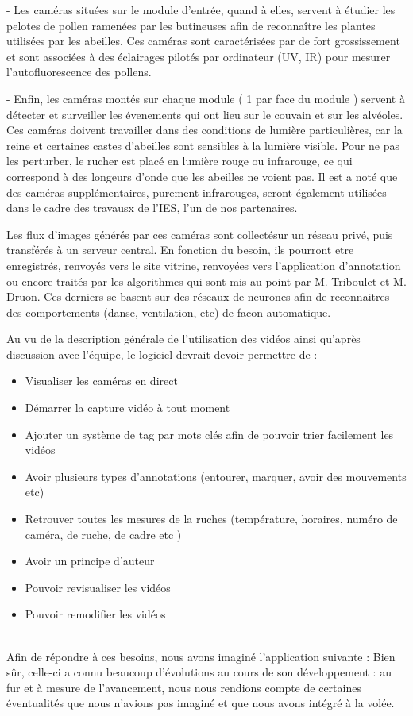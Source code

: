 \documentclass[11pt,french,a4paper]{report}
\begin{document}
- Les caméras situées sur le module d'entrée, quand à elles, servent à étudier
  les pelotes de pollen ramenées par les butineuses afin de reconnaître les
  plantes utilisées par les abeilles. Ces caméras sont caractérisées par de
  fort grossissement et sont associées à des éclairages pilotés par ordinateur
  (UV, IR) pour mesurer l'autofluorescence des pollens.

- Enfin, les caméras montés sur chaque module ( 1 par face du module ) servent
  à détecter et surveiller les évenements qui ont lieu sur le couvain et sur
  les alvéoles. Ces caméras doivent travailler dans des conditions de lumière
  particulières, car la reine et certaines castes d'abeilles sont sensibles à
  la lumière visible. Pour ne pas les perturber, le rucher est placé en
  lumière rouge ou infrarouge, ce qui correspond à des longeurs d'onde que les
  abeilles ne voient pas. Il est a noté que des caméras supplémentaires,
  purement infrarouges, seront également utilisées dans le cadre des travausx de
  l'IES, l'un de nos partenaires.


  Les flux d'images générés par ces caméras sont collectésur un réseau privé,
  puis transférés à un serveur central. En fonction du besoin, ils pourront
  etre enregistrés, renvoyés vers le site vitrine, renvoyées vers l'application d'annotation
  ou encore traités par les algorithmes qui sont mis au point par M. Triboulet et M. Druon. 
  Ces derniers se basent sur des réseaux de neurones afin de reconnaitres des comportements
  (danse, ventilation, etc) de facon automatique.


Au vu de la description générale de l'utilisation des vidéos ainsi qu'après discussion avec l'équipe, le logiciel devrait devoir permettre de : \\
\begin{itemize}
    \item Visualiser les caméras en direct
    \item Démarrer la capture vidéo à tout moment 
    \item Ajouter un système de tag par mots clés afin de pouvoir trier facilement les vidéos 
    \item Avoir plusieurs types d'annotations (entourer, marquer, avoir des mouvements etc) 
    \item Retrouver toutes les mesures de la ruches (température, horaires, numéro de caméra, de ruche, de cadre etc )  
    \item Avoir un principe d'auteur 
    \item Pouvoir revisualiser les vidéos 
    \item Pouvoir remodifier les vidéos 
\end{itemize} \\
Afin de répondre à ces besoins, nous avons imaginé l'application suivante : 
Bien sûr, celle-ci a connu beaucoup d'évolutions au cours de son développement : au fur et à mesure de l'avancement, nous nous rendions compte
de certaines éventualités que nous n'avions pas imaginé et que nous avons intégré à la volée.  \\
\end{document}

